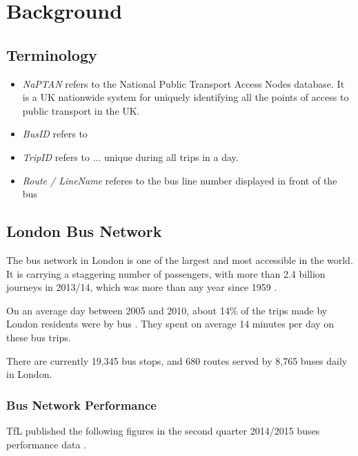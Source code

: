 \chapter{Background}

\section{Terminology}
\begin{itemize}
  \item \textit{NaPTAN} refers to the National Public Transport Access Nodes database. It is a UK nationwide system for uniquely identifying all the points of access to public transport in the UK.
	\item \textit{BusID} refers to
  \item \textit{TripID} refers to ... unique during all trips in a day.
  \item \textit{Route / LineName} referes to the bus line number displayed in front of the bus
\end{itemize}

\section{London Bus Network}

\par The bus network in London is one of the largest and most accessible in the world. It is carrying a staggering
number of passengers, with more than 2.4
billion journeys in 2013/14, which was more than any year since 1959 \cite{tfl_annual_report_13/14}.

\par On an average day between 2005 and 2010, about 14\% of the trips made by London residents were by bus \cite{tfl_ltds}. They spent on average 14 minutes per day on these bus trips.

\par There are currently 19,345 bus stops, and 680 routes served by 8,765 buses daily in London\cite{bus_stop_locations_routes}.


\subsection{Bus Network Performance}

\par TfL published the following figures in the second quarter 2014/2015 buses performance data \cite{buses_performance_report}.

